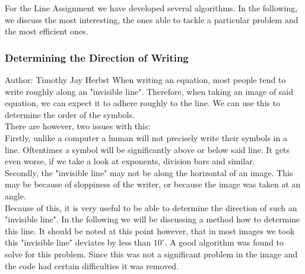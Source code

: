 \documentclass[12pt]{article}
\begin{document}
	For the Line Assignment we have developed several algorithms. In the following, we discuss the most interesting, the ones able to tackle a particular problem and the most efficient ones.
	
	\subsubsection{Determining the Direction of Writing}
	\small{Author: Timothy Jay Herbst} \newline \newline
	When writing an equation, most people tend to write roughly along an "invisible line".
	Therefore, when taking an image of said equation, we can expect it to adhere roughly to the line.
	We can use this to determine the order of the symbols.\\
	There are however, two issues with this:\\
	Firstly, unlike a computer a human will not precisely write their symbols in a line.
	Oftentimes a symbol will be significantly above or below said line.
	It gets even worse, if we take a look at exponents, division bars and similar.\\
	Secondly, the "invisible line" may not be along the horizontal of an image.
	This may be because of sloppiness of the writer, or because the image was taken at an angle.\\
	Because of this, it is very useful to be able to determine the direction of such an "invisible line".
	In the following we will be discussing a method how to determine this line.
	It should be noted at this point however, that in most images we took this "invisible line" deviates by less than $10^\circ$.
	A good algorithm was found to solve for this problem.
	Since this was not a significant problem in the image and the code had certain difficulties it was removed.
	
	
	
	
	
\end{document}
